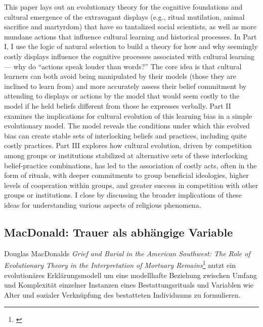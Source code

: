 \documentclass[openany,twoside,twocolumn]{book}
\let\rmarkdownfootnote\footnote%
\def\footnote{\protect\rmarkdownfootnote}
\begin{document}
This paper lays out an evolutionary theory for the cognitive foundations
and cultural emergence of the extravagant displays (e.g., ritual
mutilation, animal sacrifice and martyrdom) that have so tantalized
social scientists, as well as more mundane actions that influence
cultural learning and historical processes. In Part I, I use the logic
of natural selection to build a theory for how and why seemingly costly
displays influence the cognitive processes associated with cultural
learning --- why do ``actions speak louder than words?'' The core idea
is that cultural learners can both avoid being manipulated by their
models (those they are inclined to learn from) and more accurately
assess their belief commitment by attending to displays or actions by
the model that would seem costly to the model if he held beliefs
different from those he expresses verbally. Part II examines the
implications for cultural evolution of this learning bias in a simple
evolutionary model. The model reveals the conditions under which this
evolved bias can create stable sets of interlocking beliefs and
practices, including quite costly practices. Part III explores how
cultural evolution, driven by competition among groups or institutions
stabilized at alternative sets of these interlocking belief-practice
combinations, has led to the association of costly acts, often in the
form of rituals, with deeper commitments to group beneficial ideologies,
higher levels of cooperation within groups, and greater success in
competition with other groups or institutions. I close by discussing the
broader implications of these ideas for understanding various aspects of
religious phenomena.

\hypertarget{macdonald-trauer-als-abhangige-variable}{%
\subsection{MacDonald: Trauer als abhängige
Variable}\label{macdonald-trauer-als-abhangige-variable}}

Douglas MacDonalds \emph{Grief and Burial in the American Southwest: The
Role of Evolutionary Theory in the Interpretation of Mortuary
Remains}\footnote{\textcite{macdonald_grief_2001}} nutzt ein
evolutionäres Erklärungsmodell um eine modellhafte Beziehung zwischen
Umfang und Komplexität einzelner Instanzen eines Bestattungsrituals und
Variablen wie Alter und sozialer Verknüpfung des bestatteten Individuums
zu formulieren.
\end{document}
